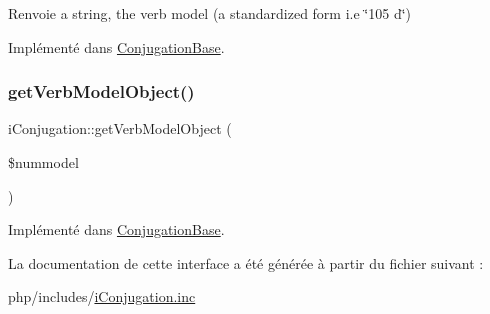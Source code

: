 \begin{DoxyReturn}{Renvoie}
a string, the verb model (a standardized form i.\+e \char`\"{}105 d\char`\"{}) 
\end{DoxyReturn}


Implémenté dans \hyperlink{class_conjugation_base_aaa7ecb3341682d48f2d2b42810de2ac2}{Conjugation\+Base}.

\hypertarget{interfacei_conjugation_ab076acd6674f8effbf5306d6b92f3ad3}{}\label{interfacei_conjugation_ab076acd6674f8effbf5306d6b92f3ad3} 
\subsubsection{\texorpdfstring{get\+Verb\+Model\+Object()}{getVerbModelObject()}}
{\footnotesize\ttfamily i\+Conjugation\+::get\+Verb\+Model\+Object (\begin{DoxyParamCaption}\item[{}]{\$nummodel }\end{DoxyParamCaption})}



Implémenté dans \hyperlink{class_conjugation_base_a31a6fb3f63b144c6d9f0e9a27d3d28cc}{Conjugation\+Base}.



La documentation de cette interface a été générée à partir du fichier suivant \+:\begin{DoxyCompactItemize}
\item 
php/includes/\hyperlink{i_conjugation_8inc}{i\+Conjugation.\+inc}\end{DoxyCompactItemize}
